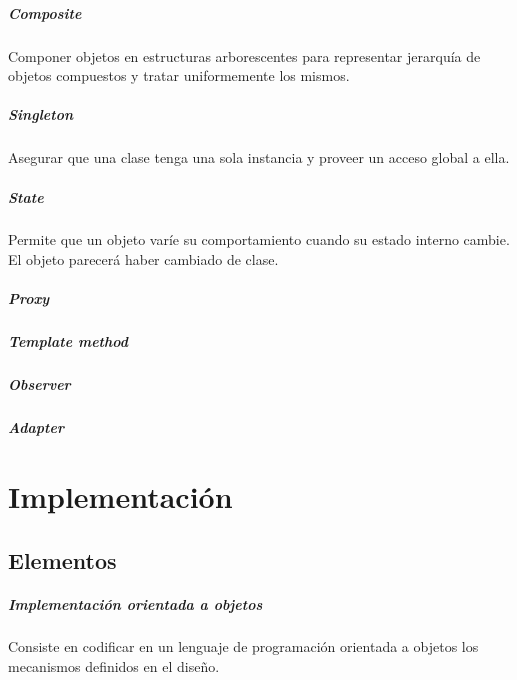 \documentclass[a4paper,12pt,oneside]{report}
\begin{document}
        \paragraph{Composite}
          Componer objetos en estructuras arborescentes para representar jerarqu\'ia de
          objetos compuestos y tratar uniformemente los mismos.

        \paragraph{Singleton}
          Asegurar que una clase tenga una sola instancia y proveer un acceso global a ella.

        \paragraph{State}
          Permite que un objeto var\'ie su comportamiento cuando su estado interno
          cambie.\\
          El objeto parecer\'a haber cambiado de clase.

        \paragraph{Proxy}
        \paragraph{Template method}
        \paragraph{Observer}
        \paragraph{Adapter}


  \chapter{Implementaci\'on}
  \thispagestyle{contenido} %
  \pagestyle{contenido}     %

    \section{Elementos}
        \paragraph{Implementaci\'on orientada a objetos}
        Consiste en codificar en un lenguaje de programaci\'on orientada a
        objetos los mecanismos definidos en el dise\~no.
\end{document}
